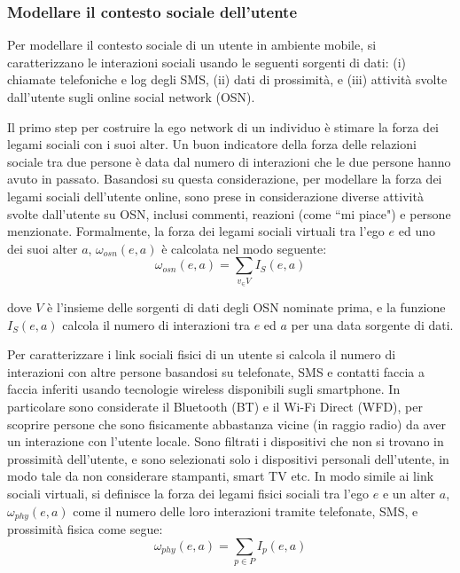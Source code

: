 \documentclass[12pt,italian]{report}
\begin{document}
\subsubsection{Modellare il contesto sociale dell'utente}
Per modellare il contesto sociale di un utente in ambiente mobile, si caratterizzano le interazioni sociali usando le seguenti sorgenti di dati: (i) chiamate telefoniche e log degli SMS, (ii) dati di prossimità, e (iii) attività svolte dall'utente sugli online social network (OSN).

Il primo step per costruire la ego network di un individuo è stimare la forza dei legami sociali con i suoi alter. Un buon indicatore della forza delle relazioni sociale tra due persone è data dal numero di interazioni che le due persone hanno avuto in passato. Basandosi su questa considerazione, per modellare la forza dei legami sociali dell'utente online, sono prese in considerazione diverse attività svolte dall'utente su OSN, inclusi commenti, reazioni (come ``mi piace") e persone menzionate. Formalmente, la forza dei legami sociali virtuali tra l'ego $e$ ed uno dei suoi alter $a$, $\omega_{osn}(e,a)$ è calcolata nel modo seguente:
\begin{equation}	
	\omega_{osn}(e,a)=\sum_{v_\in V}I_S (e, a)
\end{equation}

dove $V$ è l'insieme delle sorgenti di dati degli OSN nominate prima, e la funzione $I_S (e, a)$ calcola il numero di interazioni tra $e$ ed $a$ per una data sorgente di dati. 

Per caratterizzare i link sociali fisici di un utente si calcola il numero di interazioni con altre persone basandosi su telefonate, SMS e contatti faccia a faccia inferiti usando tecnologie wireless disponibili sugli smartphone. In particolare sono considerate il Bluetooth (BT) e il Wi-Fi Direct (WFD), per scoprire persone che sono fisicamente abbastanza vicine (in raggio radio) da aver un interazione con l'utente locale. Sono filtrati i dispositivi che non si trovano in prossimità dell'utente, e sono selezionati solo i dispositivi personali dell'utente, in modo tale da non considerare stampanti, smart TV etc. In modo simile ai link sociali virtuali, si definisce la forza dei legami fisici sociali tra l'ego $e$ e un alter $a$, $\omega_{phy}(e, a)$ come il numero delle loro interazioni tramite telefonate, SMS, e prossimità fisica come segue:
\begin{equation}
	\omega_{phy}(e, a) = \sum_{p \in P}I_p(e,a)
\end{equation}
\end{document}
